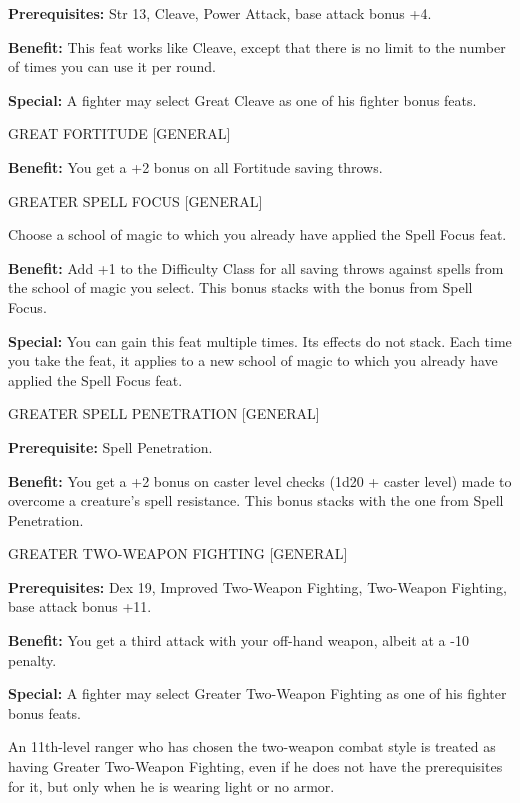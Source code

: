 \documentclass{article}
\begin{document}
\textbf{Prerequisites:} Str 13, Cleave, Power Attack, base attack bonus +4.

\textbf{Benefit:} This feat works like Cleave, except that there is no limit to 
the number of times you can use it per round.

\textbf{Special:} A fighter may select Great Cleave as one of his fighter bonus 
feats.

\vspace{12pt}
GREAT FORTITUDE [GENERAL]

\textbf{Benefit:} You get a +2 bonus on all Fortitude saving throws.

\vspace{12pt}
GREATER SPELL FOCUS [GENERAL]

Choose a school of magic to which you already have applied the Spell Focus feat.

\textbf{Benefit:} Add +1 to the Difficulty Class for all saving throws against 
spells from the school of magic you select. This bonus stacks with the bonus from 
Spell Focus.

\textbf{Special:} You can gain this feat multiple times. Its effects do not stack. 
Each time you take the feat, it applies to a new school of magic to which you already 
have applied the Spell Focus feat.

\vspace{12pt}
GREATER SPELL PENETRATION [GENERAL]

\textbf{Prerequisite:} Spell Penetration.

\textbf{Benefit:} You get a +2 bonus on caster level checks (1d20 + caster level) 
made to overcome a creature's spell resistance. This bonus stacks with the one 
from Spell Penetration.

\vspace{12pt}
GREATER TWO-WEAPON FIGHTING [GENERAL]

\textbf{Prerequisites:} Dex 19, Improved Two-Weapon Fighting, Two-Weapon Fighting, 
base attack bonus +11.

\textbf{Benefit:} You get a third attack with your off-hand weapon, albeit at a 
-10 penalty.

\textbf{Special:} A fighter may select Greater Two-Weapon Fighting as one of his 
fighter bonus feats.

An 11th-level ranger who has chosen the two-weapon combat style is treated as having 
Greater Two-Weapon Fighting, even if he does not have the prerequisites for it, 
but only when he is wearing light or no armor.
\end{document}
